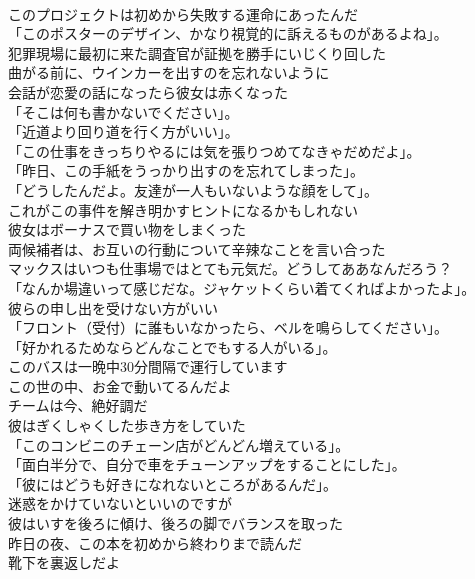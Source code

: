 \documentclass[8pt]{extreport}
\begin{document}
\begin{CJK}{UTF8}{min}
\\	このプロジェクトは初めから失敗する運命にあったんだ	
\\	「このポスターのデザイン、かなり視覚的に訴えるものがあるよね」。	
\\	犯罪現場に最初に来た調査官が証拠を勝手にいじくり回した	
\\	曲がる前に、ウインカーを出すのを忘れないように	
\\	会話が恋愛の話になったら彼女は赤くなった	
\\	「そこは何も書かないでください」。	
\\	「近道より回り道を行く方がいい」。	
\\	「この仕事をきっちりやるには気を張りつめてなきゃだめだよ」。	
\\	「昨日、この手紙をうっかり出すのを忘れてしまった」。	
\\	「どうしたんだよ。友達が一人もいないような顔をして」。	
\\	これがこの事件を解き明かすヒントになるかもしれない	
\\	彼女はボーナスで買い物をしまくった	
\\	両候補者は、お互いの行動について辛辣なことを言い合った	
\\	マックスはいつも仕事場ではとても元気だ。どうしてああなんだろう？	
\\	「なんか場違いって感じだな。ジャケットくらい着てくればよかったよ」。	
\\	彼らの申し出を受けない方がいい	
\\	「フロント（受付）に誰もいなかったら、ベルを鳴らしてください」。	
\\	「好かれるためならどんなことでもする人がいる」。	
\\	このバスは一晩中30分間隔で運行しています	
\\	この世の中、お金で動いてるんだよ	
\\	チームは今、絶好調だ	
\\	彼はぎくしゃくした歩き方をしていた	
\\	「このコンビニのチェーン店がどんどん増えている」。	
\\	「面白半分で、自分で車をチューンアップをすることにした」。	
\\	「彼にはどうも好きになれないところがあるんだ」。	
\\	迷惑をかけていないといいのですが	
\\	彼はいすを後ろに傾け、後ろの脚でバランスを取った	
\\	昨日の夜、この本を初めから終わりまで読んだ	
\\	靴下を裏返しだよ	

\end{CJK}
\end{document}
